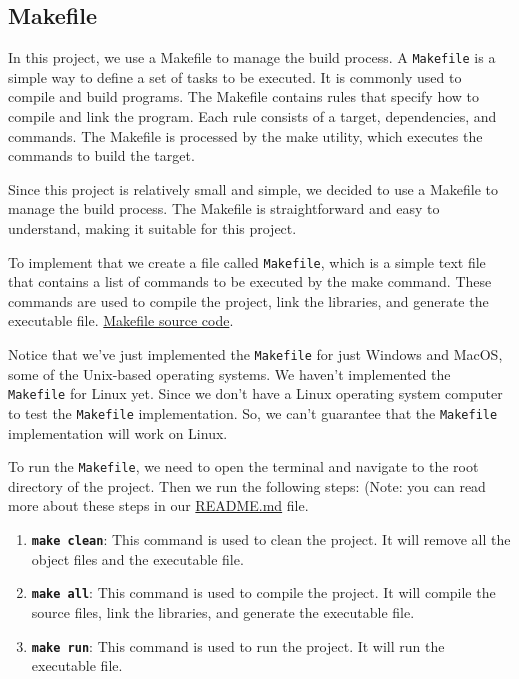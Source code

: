 \subsection{Makefile}
\label{subsec:makefile}

\hspace{1cm} In this project, we use a Makefile to manage the build process. A \texttt{Makefile} is a simple way to define a set of tasks to be executed. It is commonly used to compile and build programs. The Makefile contains rules that specify how to compile and link the program. Each rule consists of a target, dependencies, and commands. The Makefile is processed by the make utility, which executes the commands to build the target.

\vspace{0.5cm}

\hspace{1cm} Since this project is relatively small and simple, we decided to use a Makefile to manage the build process. The Makefile is straightforward and easy to understand, making it suitable for this project. 
\vspace{0.5cm}

\hspace{1cm} To implement that we create a file called \texttt{Makefile}, which is a simple text file that contains a list of commands to be executed by the make command. These commands are used to compile the project, link the libraries, and generate the executable file. \href{https://github.com/anhtri2407/Poker/blob/main/Makefile}{Makefile source code}.

\vspace{0.5cm}

\hspace{1cm} Notice that we've just implemented the \texttt{Makefile} for just Windows and MacOS, some of the Unix-based operating systems. We haven't implemented the \texttt{Makefile} for Linux yet. Since we don't have a Linux operating system computer to test the \texttt{Makefile} implementation. So, we can't guarantee that the \texttt{Makefile} implementation will work on Linux.

\vspace{0.5cm}

\hspace{1cm} To run the \texttt{Makefile}, we need to open the terminal and navigate to the root directory of the project. Then we run the following steps: (Note: you can read more about these steps in our \href{https://github.com/anhtri2407/Poker/blob/main/README.md}{README.md} file.
\begin{enumerate}
    \item \textbf{\texttt{make clean}}: This command is used to clean the project. It will remove all the object files and the executable file.
    \item \textbf{\texttt{make all}}: This command is used to compile the project. It will compile the source files, link the libraries, and generate the executable file.
    \item \textbf{\texttt{make run}}: This command is used to run the project. It will run the executable file.
\end{enumerate}

